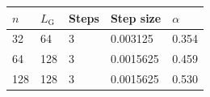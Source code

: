 \begin{tabular}{lllll}
\hline
$n$ & $L_{\mathrm G}$ & Steps & Step size & $\alpha$ \\
\hline
32 & 64 & 3 & 0.003125 & 0.354 \\
64 & 128 & 3 & 0.0015625 & 0.459 \\
128 & 128 & 3 & 0.0015625 & 0.530 \\
\hline
\end{tabular}
